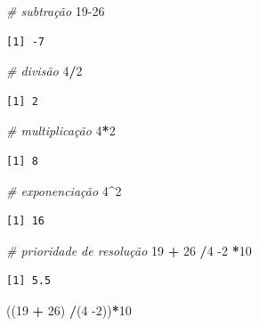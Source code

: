 \documentclass[12pt,brazil,oneside]{book}
\newenvironment{Shaded}{\begin{snugshade}}{\end{snugshade}}
\newcommand{\CommentTok}[1]{\textcolor[rgb]{0.56,0.35,0.01}{\textit{#1}}}
\newcommand{\DecValTok}[1]{\textcolor[rgb]{0.00,0.00,0.81}{#1}}
\newcommand{\NormalTok}[1]{#1}
\newcommand{\OperatorTok}[1]{\textcolor[rgb]{0.81,0.36,0.00}{\textbf{#1}}}
\newcommand{\StringTok}[1]{\textcolor[rgb]{0.31,0.60,0.02}{#1}}
\begin{document}
\begin{Shaded}
\begin{Highlighting}[]
\CommentTok{# subtração}
\DecValTok{19-26}
\end{Highlighting}
\end{Shaded}

\begin{verbatim}
[1] -7
\end{verbatim}

\begin{Shaded}
\begin{Highlighting}[]
\CommentTok{# divisão}
\DecValTok{4}\OperatorTok{/}\DecValTok{2}
\end{Highlighting}
\end{Shaded}

\begin{verbatim}
[1] 2
\end{verbatim}

\begin{Shaded}
\begin{Highlighting}[]
\CommentTok{# multiplicação }
\DecValTok{4}\OperatorTok{*}\DecValTok{2}
\end{Highlighting}
\end{Shaded}

\begin{verbatim}
[1] 8
\end{verbatim}

\begin{Shaded}
\begin{Highlighting}[]
\CommentTok{# exponenciação}
\DecValTok{4}\OperatorTok{^}\DecValTok{2}
\end{Highlighting}
\end{Shaded}

\begin{verbatim}
[1] 16
\end{verbatim}

\begin{Shaded}
\begin{Highlighting}[]
\CommentTok{# prioridade de resolução}
\DecValTok{19} \OperatorTok{+}\StringTok{ }\DecValTok{26} \OperatorTok{/}\DecValTok{4} \DecValTok{-2} \OperatorTok{*}\DecValTok{10}
\end{Highlighting}
\end{Shaded}

\begin{verbatim}
[1] 5.5
\end{verbatim}

\begin{Shaded}
\begin{Highlighting}[]
\NormalTok{((}\DecValTok{19} \OperatorTok{+}\StringTok{ }\DecValTok{26}\NormalTok{) }\OperatorTok{/}\NormalTok{(}\DecValTok{4} \DecValTok{-2}\NormalTok{))}\OperatorTok{*}\DecValTok{10}
\end{Highlighting}
\end{Shaded}
\end{document}
